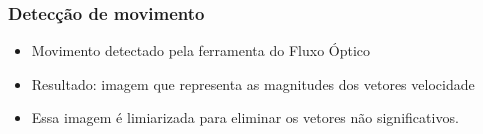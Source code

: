 \documentclass{beamer}
\begin{document}
\begin{frame}
\frametitle{Detecção de movimento}
\begin{itemize}
\item Movimento detectado pela ferramenta do Fluxo Óptico
\item Resultado: imagem que representa as magnitudes dos vetores velocidade
\item Essa imagem é limiarizada para eliminar os vetores não significativos.
\end{itemize}
\end{frame}

\end{document}
